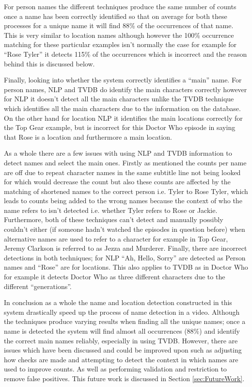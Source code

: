 For person names the different techniques produce the same number of counts once a name has been correctly identified so that on average for both these processes for a unique name it will find 88\% of the occurrences of that name. This is very similar to location names although however the 100\% occurrence matching for these particular examples isn’t normally the case for example for “Rose Tyler” it detects 115\% of the occurrences which is incorrect and the reason behind this is discussed below.

Finally, looking into whether the system correctly identifies a “main” name. For person names, NLP and TVDB do identify the main characters correctly however for NLP it doesn’t detect all the main characters unlike the TVDB technique which identifies all the main characters due to the information on the database. On the other hand for location NLP it identifies the main locations correctly for the Top Gear example, but is incorrect for this Doctor Who episode in saying that Rose is a location and furthermore a main location.

As a whole there are a few issues with using NLP and TVDB information to detect names and select the main ones. Firstly as mentioned the counts per name are off due to repeat character names in the same subtitle line not being looked for which would decrease the count but also these counts are affected by the matching of shortened names to the correct person i.e. Tyler to Rose Tyler, which leads to counts being added to the wrong names because the context of who the name refers to isn’t detected i.e. whether Tyler refers to Rose or Jackie. Furthermore, both of these techniques can’t detect and manually possibly couldn’t either (if someone hadn’t watched the episodes in question before) when alternative names are used to refer to a character for example in Top Gear, Jeremy Clarkson is referred to as Jezza and Murderer. Finally, there are incorrect detections in both techniques; for NLP “Ah, Hello, Sorry” are detected as Person names and “Rose” are for locations. This also applies to TVDB as in Doctor Who for example it detects Doctor Who as three different characters due to the different “generations”. 

In conclusion as a whole the name and location detection constructed  in this system drastically speed up the process of name detection in a video. Although the techniques produce varying results when finding all the unique names; once a name is detected the system will find almost all occurrences (88\%) and identify the correct main names reliably, especially in using TVDB. However, there are issues which have been discussed and could be improved upon such as adjusting how checks are made and attempting to detect the context in which names are used to improve counts. As well as performing validation and restriction to remove false positives. This future work is discussed in Section \ref{sec:FutureWork}.

